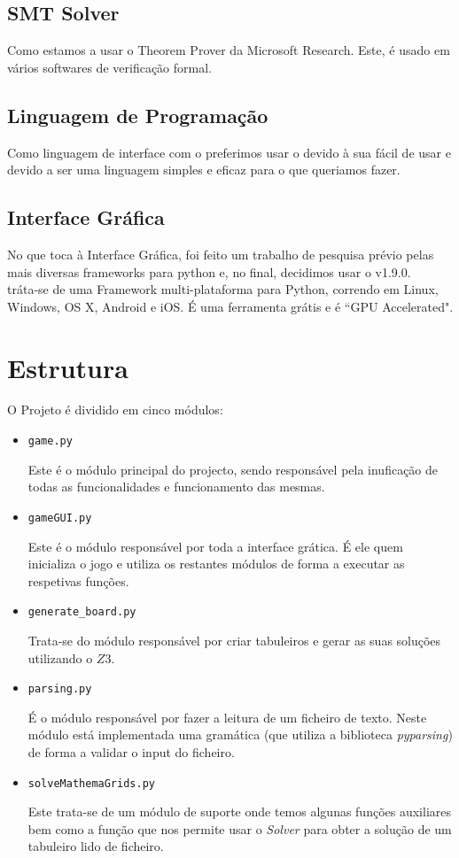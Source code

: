 \documentclass{article}
\begin{document}
\subsection{SMT Solver}
Como {} estamos a usar o {} Theorem Prover da Microsoft Research. Este, é usado em vários softwares de verificação formal. 

\subsection{Linguagem de Programação}
Como linguagem de interface com o {} preferimos usar o {} {} devido à sua {} fácil de usar e devido a ser uma linguagem simples e eficaz para o que queriamos fazer.

\subsection{Interface Gráfica}
No que toca à Interface Gráfica, foi feito um trabalho de pesquisa prévio pelas mais diversas frameworks para python e, no final, decidimos usar o {} v1.9.0. 
\\

{} tráta-se de uma Framework multi-plataforma para Python, correndo em Linux, Windows, OS X, Android e iOS. É uma ferramenta grátis e é ``GPU Accelerated". 

\section{Estrutura}
O Projeto é dividido em cinco módulos:
\begin{itemize}
\item{\texttt{game.py}

Este é o módulo principal do projecto, sendo responsável pela inuficação de todas as funcionalidades e funcionamento das mesmas.}

\item{\texttt{gameGUI.py}

Este é o módulo responsável por toda a interface grática. É ele quem inicializa o jogo e utiliza os restantes módulos de forma a executar as respetivas funções.}

\item{\texttt{generate\_board.py}

Trata-se do módulo responsável por criar tabuleiros e gerar as suas soluções utilizando o $Z3$.}

\item{\texttt{parsing.py}

É o módulo responsável por fazer a leitura de um ficheiro de texto. Neste módulo está implementada uma gramática (que utiliza a biblioteca {\it{pyparsing}}) de forma a validar o input do ficheiro.}

\item{\texttt{solveMathemaGrids.py}

Este trata-se de um módulo de suporte onde temos algunas funções auxiliares bem como a função que nos permite usar o {\it{Solver}} para obter a solução de um tabuleiro lido de ficheiro.}
\end{itemize}
\end{document}

